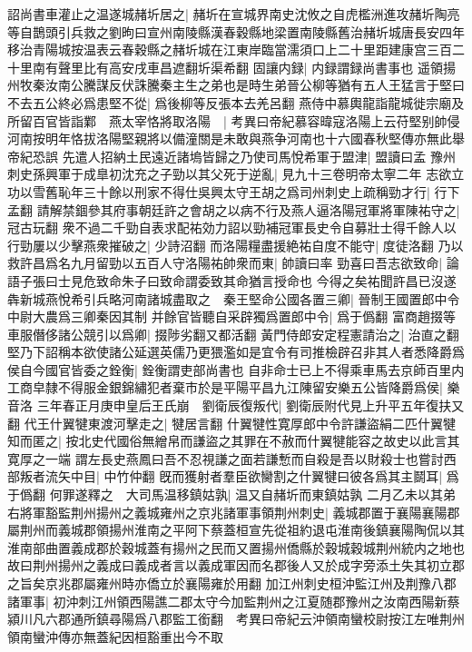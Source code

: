 詔尚書車灌止之温遂城赭圻居之|{
	赭圻在宣城界南史沈攸之自虎檻洲進攻赭圻陶亮等自鵲頭引兵救之劉昫曰宣州南陵縣漢春穀縣地梁置南陵縣舊治赭圻城唐長安四年移治青陽城按温表云春穀縣之赭圻城在江東岸臨當濡須口上二十里距建康宫三百二十里南有聲里比有高安戌車昌遮翻圻渠希翻}
固讓内録|{
	内録謂録尚書事也}
遥領揚州牧秦汝南公騰謀反伏誅騰秦主生之弟也是時生弟晉公柳等猶有五人王猛言于堅曰不去五公終必爲患堅不從|{
	爲後柳等反張本去羌呂翻}
燕侍中慕輿龍詣龍城徙宗廟及所留百官皆詣鄴　燕太宰恪將取洛陽　|{
	考異曰帝紀慕容暐寇洛陽上云苻堅别帥侵河南按明年恪拔洛陽堅親將以備潼關是未敢與燕争河南也十六國春秋堅傳亦無此舉帝紀恐誤}
先遣人招納土民遠近諸塢皆歸之乃使司馬悅希軍于盟津|{
	盟讀曰孟}
豫州刺史孫興軍于成臯初沈充之子勁以其父死于逆亂|{
	見九十三卷明帝太寧二年}
志欲立功以雪舊恥年三十餘以刑家不得仕吳興太守王胡之爲司州刺史上疏稱勁才行|{
	行下孟翻}
請解禁錮參其府事朝廷許之會胡之以病不行及燕人逼洛陽冠軍將軍陳祐守之|{
	冠古玩翻}
衆不過二千勁自表求配祐効力詔以勁補冠軍長史令自募壯士得千餘人以行勁屢以少擊燕衆摧破之|{
	少詩沼翻}
而洛陽糧盡援絶祐自度不能守|{
	度徒洛翻}
乃以救許昌爲名九月留勁以五百人守洛陽祐帥衆而東|{
	帥讀曰率}
勁喜曰吾志欲致命|{
	論語子張曰士見危致命朱子曰致命謂委致其命猶言授命也}
今得之矣祐聞許昌已沒遂犇新城燕悅希引兵略河南諸城盡取之　秦王堅命公國各置三卿|{
	晉制王國置郎中令中尉大農爲三卿秦因其制}
并餘官皆聽自采辟獨爲置郎中令|{
	爲于僞翻}
富商趙掇等車服僭侈諸公競引以爲卿|{
	掇陟劣翻又都活翻}
黃門侍郎安定程憲請治之|{
	治直之翻}
堅乃下詔稱本欲使諸公延選英儒乃更猥濫如是宜令有司推檢辟召非其人者悉降爵爲侯自今國官皆委之銓衡|{
	銓衡謂吏部尚書也}
自非命士已上不得乘車馬去京師百里内工商皁隸不得服金銀錦繡犯者棄市於是平陽平昌九江陳留安樂五公皆降爵爲侯|{
	樂音洛}
三年春正月庚申皇后王氏崩　劉衛辰復叛代|{
	劉衛辰附代見上升平五年復扶又翻}
代王什翼犍東渡河擊走之|{
	犍居言翻}
什翼犍性寛厚郎中令許謙盜絹二匹什翼犍知而匿之|{
	按北史代國俗無繒帛而謙盜之其罪在不赦而什翼犍能容之故史以此言其寛厚之一端}
謂左長史燕鳳曰吾不忍視謙之面若謙慙而自殺是吾以財殺士也嘗討西部叛者流矢中目|{
	中竹仲翻}
旣而獲射者羣臣欲臠割之什翼犍曰彼各爲其主鬬耳|{
	爲于僞翻}
何罪遂釋之　大司馬温移鎮姑孰|{
	温又自赭圻而東鎮姑孰}
二月乙未以其弟右將軍豁監荆州揚州之義城雍州之京兆諸軍事領荆州刺史|{
	義城郡置于襄陽襄陽郡屬荆州而義城郡領揚州淮南之平阿下蔡蓋桓宣先從祖約退屯淮南後鎮襄陽陶侃以其淮南部曲置義成郡於穀城蓋有揚州之民而又置揚州僑縣於穀城穀城荆州統内之地也故曰荆州揚州之義成曰義成者言以義成軍因而名郡後人又於成字旁添土失其初立郡之旨矣京兆郡屬雍州時亦僑立於襄陽雍於用翻}
加江州刺史桓沖監江州及荆豫八郡諸軍事|{
	初沖刺江州領西陽譙二郡太守今加監荆州之江夏随郡豫州之汝南西陽新蔡潁川凡六郡通所鎮尋陽爲八郡監工銜翻　考異曰帝紀云沖領南蠻校尉按江左唯荆州領南蠻沖傳亦無蓋紀因桓豁重出今不取}
